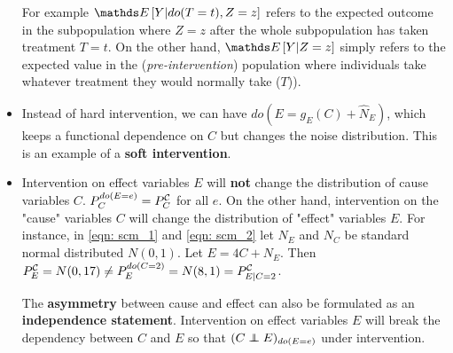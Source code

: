 \documentclass[11pt]{article}
\begin{document}
\begin{itemize}
For example $\E{}{Y| do(T=t), Z=z}$ refers to the expected outcome in the subpopulation where $Z=z$ after the whole subpopulation has taken treatment $T=t$.  On the other hand,  $\E{}{Y| Z=z}$ simply refers to the expected value in the (\emph{pre-intervention}) population where individuals take whatever treatment they would normally take ($T$)). 

\item Instead of hard intervention, we can have $do(E=g_{E}(C) + \hat{N}_{E})$, which keeps a functional dependence on $C$ but changes the noise distribution. This is an example of a \textbf{soft intervention}.

\item Intervention on effect variables $E$ will \textbf{not} change the distribution of cause variables $C$. $P_{C}^{do(E=e)} = P_{C}^{{\mathcal C}}$ for all $e$. On the other hand, intervention on the "cause" variables $C$ will change the distribution of "effect" variables $E$. For instance, in \eqref{eqn: scm_1} and \eqref{eqn: scm_2} let $N_E$ and $N_C$ be standard normal distributed $N(0,1)$. Let $E = 4 C + N_{E}$. Then $P_{E}^{{\mathcal C}} = N(0, 17) \neq P_{E}^{do(C=2)} = N(8, 1) = P_{E|C=2}^{{\mathcal C}}$. 

The \textbf{asymmetry} between cause and effect can also be formulated as an \textbf{independence statement}. Intervention on effect variables $E$ will break the dependency between $C$ and $E$ so that $(C \indep E)_{do(E=e)}$ under intervention. %
\end{itemize}
\end{document}
